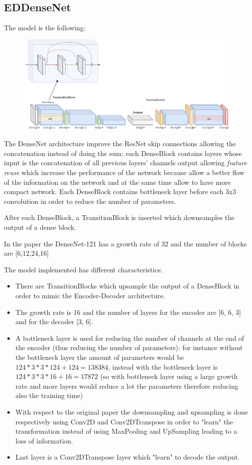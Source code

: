 \subsection{EDDenseNet}
The model is the following:
\begin{figure}[H]
    \centering
    \includegraphics[scale=0.5]{subsections/densenet/densenet.png}
\end{figure}

The DenseNet\cite{densenet} architecture improve the ResNet skip connections allowing the concatenation instead of doing the sum: each DenseBlock contains layers whose input is the concatenation of all previous layers' channels output allowing \textit{feature reuse} which increase the performance of the network because allow a better flow of the information on the network and at the same time allow to have more compact network.
Each DenseBlock contains bottleneck layer before each 3x3 convolution in order to reduce the number of parameters.

After each DenseBlock, a TransitionBlock is inserted which downsamples the output of a dense block.

In the paper the DenseNet-121 has a growth rate of 32 and the number of blocks are [6,12,24,16]  

The model implemented has different characteristics:
\begin{itemize}
    \item There are TransitionBlocks which upsample the output of a DenseBlock in order to mimic the Encoder-Decoder architecture.
    \item The growth rate is 16 and the number of layers for the encoder are [6, 6, 3] and for the decoder [3, 6].
    \item A bottleneck layer is used for reducing the number of channels at the end of the encoder (thus reducing the number of parameters): for instance without the bottleneck layer the amount of parameters would be $124*3*3*124+124=138384$, instead with the bottleneck layer is $124*3*3*16+16 = 17872$ (so with bottleneck layer using a large growth rate and more layers would reduce a lot the parameters therefore reducing also the training time)
    \item With respect to the original paper the downsampling and upsampling is done respectively using Conv2D and Conv2DTranspose in order to "learn" the transformation instead of using MaxPooling and UpSampling leading to a loss of information.
    \item Last layer is a Conv2DTranspose layer which "learn" to decode the output.
\end{itemize}

